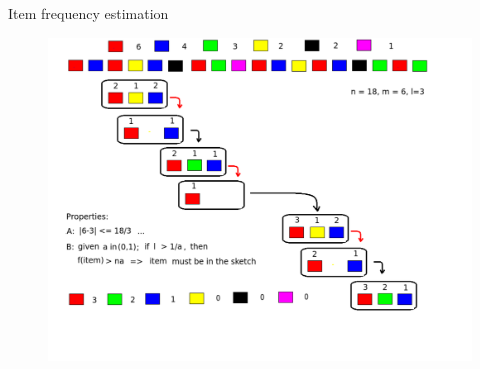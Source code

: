 \documentclass[first=dgreen,second=purple,logo=redque]{aaltoslides}
\begin{document}
\begin{frame}[allowframebreaks=1]{Item frequency estimation}
\framebreak
\quad
\begin{figure}
  \includegraphics[scale=0.4]{plots/freqitems}
 \label{fig:fp}
\end{figure}
\end{frame}
\end{document}
